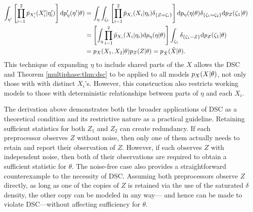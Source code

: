 \begin{align*}
\int_{\eta'}\left[ \prod_{i=1}^2 \tilde p_{X_i'}(X_i' |\eta_i')  \right]\mathrm{d} p_\eta'( \eta' | \theta) & = \int_\eta\int_{\zeta_1}\left[ \prod_{i=1}^2 \tilde p_{X_i}(X_i |\eta_i)\delta_{\{Z=\zeta_i\}}  \right]\mathrm{d} p_\eta( \eta | \theta)
\delta_{\{\zeta_1=\zeta_2\}}\mathrm{d} p_{Z}(\zeta_1|\theta)  \\
& =  \left[ \int_\eta\prod_{i=1}^2 \tilde p_{X_i}(X_i |\eta_i)\mathrm{d} p_\eta( \eta | \theta)\right] \int_{\zeta_1}
\delta_{\{\zeta_1=Z\}}\mathrm{d} p_{Z}(\zeta_1|\theta) \\
& =p_{X_{}}(X_1, X_2|\theta)p_{Z}(Z|\theta)=p_{\tilde X}(\tilde X|\theta).
\end{align*}
This technique of expanding $\eta$ to include shared parts of the $X$ allows the DSC and Theorem \ref{multiphase:thm:dsc} to be applied to all models $p_X(X | \theta)$, not only those with with distinct $X_i$'s.
However, this construction also restricts working models to those with deterministic relationships between parts of $\eta$ and each $X_i$.

The derivation above demonstrates both the broader applications of DSC as a theoretical condition and its restrictive nature as a practical guideline. Retaining sufficient statistics for both $Z_1$ and $Z_2$ can create redundancy.
%
If each preprocessor observes $Z$ without noise, then only one of them actually needs to retain and report their observation of $Z$.
However, if each observes $Z$ with independent noise, then both of their observations are required to obtain a sufficient statistic for $\theta$.
%
The noise-free case also provides a straightforward counterexample to the necessity of DSC. Assuming both preprocessors observe $Z$ directly, as long as one of the copies of $Z$ is retained via the use of the saturated  $\delta$ density, the other copy can be modeled in any way--- and hence can be made to violate DSC---without affecting sufficiency for $\theta$.

